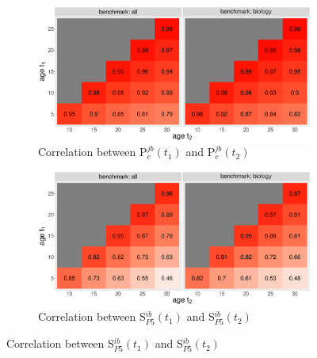 \begin{figure}[ht!]
    \centering
    \begin{subfigure}[b]{0.8\textwidth}
        \centering
             \includegraphics[width=\textwidth]{figures/pred_power/heatmap_cor_pub.eps}
         \caption{Correlation between P$_c^{jb}(t_1)$ and P$_c^{jb}(t_2)$}
         \label{fig:hm_rp_pub}
    \end{subfigure}

    \begin{subfigure}[b]{0.8\textwidth}
        \centering
             \includegraphics[width=\textwidth]{figures/pred_power/heatmap_cor_aut.eps}
         \caption{Correlation between S$_{P5}^{ib}(t_1)$ and S$_{P5}^{ib}(t_2)$}
         \label{fig:hm_rp_aut}
    \end{subfigure}


\end{figure}
